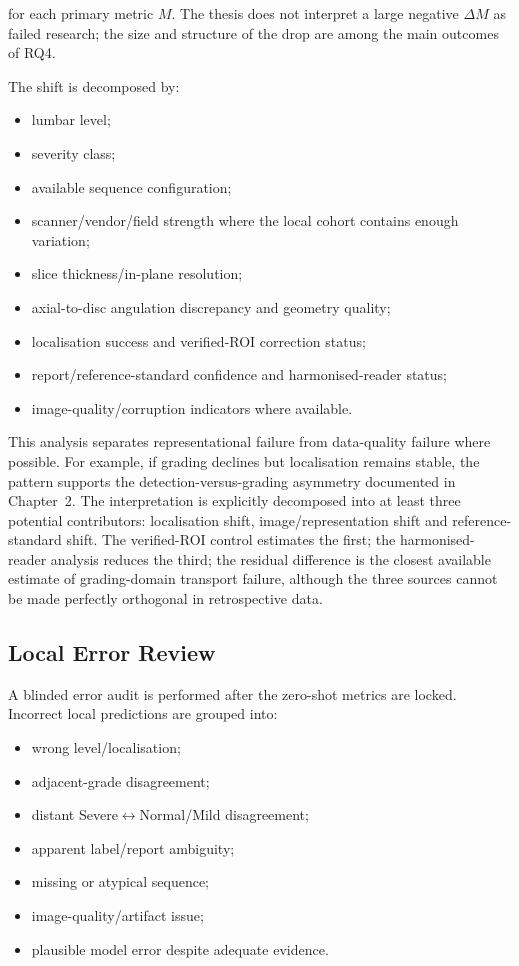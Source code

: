 for each primary metric $M$. The thesis does not interpret a large negative
$\Delta M$ as failed research; the size and structure of the drop are among the
main outcomes of RQ4.

The shift is decomposed by:

\begin{itemize}
  \item lumbar level;
  \item severity class;
  \item available sequence configuration;
  \item scanner/vendor/field strength where the local cohort contains enough
        variation;
  \item slice thickness/in-plane resolution;
  \item axial-to-disc angulation discrepancy and geometry quality;
  \item localisation success and verified-ROI correction status;
  \item report/reference-standard confidence and harmonised-reader status;
  \item image-quality/corruption indicators where available.
\end{itemize}

This analysis separates representational failure from data-quality failure
where possible. For example, if grading declines but localisation remains
stable, the pattern supports the detection-versus-grading asymmetry documented
in Chapter~2. The interpretation is explicitly decomposed into at least three
potential contributors: localisation shift, image/representation shift and
reference-standard shift. The verified-ROI control estimates the first; the
harmonised-reader analysis reduces the third; the residual difference is the
closest available estimate of grading-domain transport failure, although the
three sources cannot be made perfectly orthogonal in retrospective data.

\subsection{Local Error Review}
\label{sec:method-local-error-review}

A blinded error audit is performed after the zero-shot metrics are locked.
Incorrect local predictions are grouped into:

\begin{itemize}
  \item wrong level/localisation;
  \item adjacent-grade disagreement;
  \item distant Severe$\leftrightarrow$Normal/Mild disagreement;
  \item apparent label/report ambiguity;
  \item missing or atypical sequence;
  \item image-quality/artifact issue;
  \item plausible model error despite adequate evidence.
\end{itemize}

